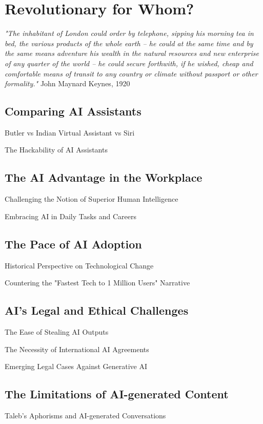 \setchapterpreamble[u]{\margintoc}
\chapter{Revolutionary for Whom?}

\textit{"The inhabitant of London could order by telephone, sipping his morning tea in bed, the various products of the whole earth -- he could at the same time and by the same means adventure his wealth in the natural resources and new enterprise of any quarter of the world -- he could secure forthwith, if he wished, cheap and comfortable means of transit to any country or climate without passport or other formality."} John Maynard Keynes, 1920 \cite{Keynes2012}

\section{Comparing AI Assistants}
Butler vs Indian Virtual Assistant vs Siri

The Hackability of AI Assistants

\section{The AI Advantage in the Workplace}
Challenging the Notion of Superior Human Intelligence

Embracing AI in Daily Tasks and Careers

\section{The Pace of AI Adoption}
Historical Perspective on Technological Change

Countering the "Fastest Tech to 1 Million Users" Narrative

\section{AI's Legal and Ethical Challenges}
The Ease of Stealing AI Outputs

The Necessity of International AI Agreements

Emerging Legal Cases Against Generative AI

\section{The Limitations of AI-generated Content}
Taleb's Aphorisms and AI-generated Conversations

